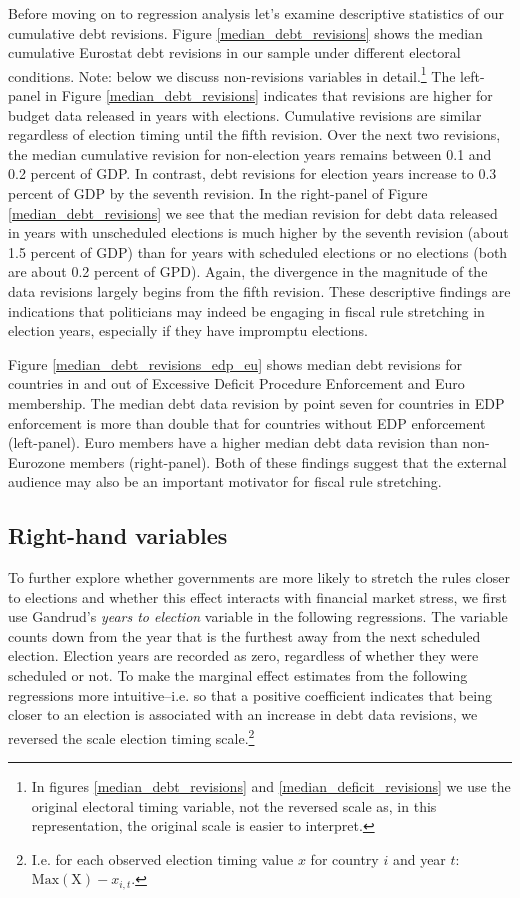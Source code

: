 \documentclass[]{article}
\begin{document}
Before moving on to regression analysis let's examine descriptive statistics of our cumulative debt revisions. Figure \ref{median_debt_revisions} shows the median cumulative Eurostat debt revisions in our sample under different electoral conditions. Note: below we discuss non-revisions variables in detail.\footnote{In figures \ref{median_debt_revisions} and \ref{median_deficit_revisions} we use the original electoral timing variable, not the reversed scale as, in this representation, the original scale is easier to interpret.} The left-panel in Figure \ref{median_debt_revisions} indicates that revisions are higher for budget data released in years with elections. Cumulative revisions are similar regardless of election timing until the fifth revision. Over the next two revisions, the median cumulative revision for non-election years remains between 0.1 and 0.2 percent of GDP. In contrast, debt revisions for election years increase to 0.3 percent of GDP by the seventh revision. In the right-panel of Figure \ref{median_debt_revisions} we see that the median revision for debt data released in years with unscheduled elections is much higher by the seventh revision (about 1.5 percent of GDP) than for years with scheduled elections or no elections (both are about 0.2 percent of GPD). Again, the divergence in the magnitude of the data revisions largely begins from the fifth revision. These descriptive findings are indications that politicians may indeed be engaging in fiscal rule stretching in election years, especially if they have impromptu elections.

Figure \ref{median_debt_revisions_edp_eu} shows median debt revisions for countries in and out of Excessive Deficit Procedure Enforcement and Euro membership. The median debt data revision by point seven for countries in EDP enforcement is more than double that for countries without EDP enforcement (left-panel). Euro members have a higher median debt data revision than non-Eurozone members (right-panel). Both of these findings suggest that the external audience may also be an important motivator for fiscal rule stretching.

\subsection{Right-hand variables}

To further explore whether governments are more likely to stretch the rules closer to elections and whether this effect interacts with financial market stress, we first use Gandrud's \citeyearpar{gandrudYrcurnt} \emph{years to election} variable in the following regressions. The variable counts down from the year that is the furthest away from the next scheduled election. Election years are recorded as zero, regardless of whether they were scheduled or not. To make the marginal effect estimates from the following regressions more intuitive--i.e. so that a positive coefficient indicates that being closer to an election is associated with an increase in debt data revisions, we reversed the scale election timing scale.\footnote{I.e. for each observed election timing value $x$ for country $i$ and year $t$: $\mathrm{Max}(\mathrm{X}) - x_{i,t}$.}
\end{document}
